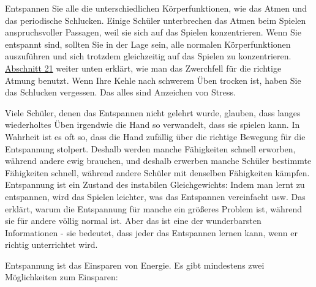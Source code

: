 Entspannen Sie alle die unterschiedlichen Körperfunktionen, wie das Atmen und das periodische Schlucken.
Einige Schüler unterbrechen das Atmen beim Spielen anspruchsvoller Passagen, weil sie sich auf das Spielen konzentrieren.
Wenn Sie entspannt sind, sollten Sie in der Lage sein, alle normalen Körperfunktionen auszuführen und sich trotzdem gleichzeitig auf das Spielen zu konzentrieren.
\hyperref[c1ii21]{Abschnitt 21} weiter unten erklärt, wie man das Zwerchfell für die richtige Atmung benutzt.
Wenn Ihre Kehle nach schwerem Üben trocken ist, haben Sie das Schlucken vergessen.
Das alles sind Anzeichen von Stress.

Viele Schüler, denen das Entspannen nicht gelehrt wurde, glauben, dass langes wiederholtes Üben irgendwie die Hand so verwandelt, dass sie spielen kann.
In Wahrheit ist es oft so, dass die Hand zufällig über die richtige Bewegung für die Entspannung stolpert.
Deshalb werden manche Fähigkeiten schnell erworben, während andere ewig brauchen, und deshalb erwerben manche Schüler bestimmte Fähigkeiten schnell, während andere Schüler mit denselben Fähigkeiten kämpfen.
Entspannung ist ein Zustand des instabilen Gleichgewichts: Indem man lernt zu entspannen, wird das Spielen leichter, was das Entspannen vereinfacht usw.
Das erklärt, warum die Entspannung für manche ein größeres Problem ist, während sie für andere völlig normal ist.
Aber das ist eine der wunderbarsten Informationen - sie bedeutet, dass jeder das Entspannen lernen kann, wenn er richtig unterrichtet wird.

Entspannung ist das Einsparen von Energie.
Es gibt mindestens zwei Möglichkeiten zum Einsparen:

